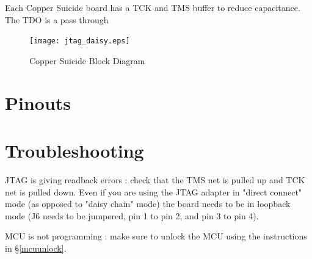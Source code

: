 \documentclass{article}
\begin{document}
Each Copper Suicide board has a TCK and TMS buffer to reduce capacitance. The TDO is a pass through 

\begin{figure}[H]
  \centering
  \texttt{[image: jtag\_daisy.eps]}
  \caption{Copper Suicide Block Diagram}
  \label{fig:jtagdaisy}
\end{figure}

\section{Pinouts}

\section{Troubleshooting}

JTAG is giving readback errors : check that the TMS net is pulled up and TCK net is pulled down. Even if you are using the JTAG adapter in "direct connect" mode (as opposed to "daisy chain" mode) the board needs to be in loopback mode (J6 needs to be jumpered, pin 1 to pin 2, and pin 3 to pin 4).

MCU is not programming :  make sure to unlock the MCU using the instructions in \S\ref{mcuunlock}.
\end{document}
